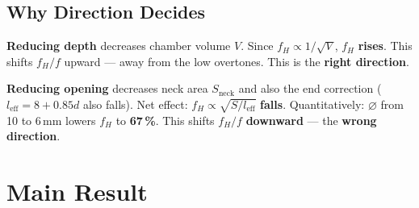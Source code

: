 \documentclass[11pt,a4paper]{article}
\begin{document}
\begin{table}[H]
\centering\small
{}
\caption{The seven variants. Upper group: depth varies. Lower group: opening varies.}
\end{table}

\subsection{Why Direction Decides}

\textbf{Reducing depth} decreases chamber volume $V$. Since $f_H \propto 1/\sqrt{V}$, $f_H$ \textbf{rises}. This shifts $f_H/f$ upward --- away from the low overtones. This is the \textbf{right direction}.

\textbf{Reducing opening} decreases neck area $S_\text{neck}$ and also the end correction ($l_\text{eff} = 8 + 0{.}85 d$ also falls). Net effect: $f_H \propto \sqrt{S/l_\text{eff}}$ \textbf{falls}. Quantitatively: $\varnothing$ from 10 to 6\,mm lowers $f_H$ to \textbf{67\,\%}. This shifts $f_H/f$ \textbf{downward} --- the \textbf{wrong direction}.

\section{Main Result}
\end{document}
